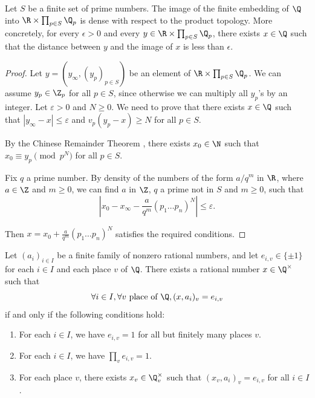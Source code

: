 \begin{theorem}\label{thm:approximation}%
	\leanok
	Let $S$ be a finite set of prime numbers.
	The image of the finite embedding of $\Q$ into $\R \times \prod_{p \in S} \Q_p$ is dense with respect to
	the product topology. More concretely, for every $\epsilon > 0$ and every
	$y \in \R \times \prod_{p \in S} \Q_p$, there exists $x \in \Q$ such that the distance
	between $y$ and the image of $x$ is less than $\epsilon$.
\end{theorem}
\begin{proof}
	Let $y=(y_\infty, (y_p)_{p \in S})$ be an element of $\R \times \prod_{p \in S} \Q_p$.
	We can assume $y_p \in \Z_p$ for all $p \in S$, since otherwise we can multiply all $y_p$'s by an
	integer. Let $\varepsilon > 0$ and $N \ge 0$. We need to prove that there exists $x \in \Q$ such that
	$|y_\infty - x| \le \varepsilon$ and $v_p(y_p - x) \ge N$ for all $p \in S$.

	By the Chinese Remainder Theorem , there exists $x_0 \in \N$
	such that $x_0 \equiv y_p \pmod{p^N}$ for all $p \in S$.

	Fix $q$ a prime number. By density of the numbers of the form $a/q^m$ in $\R$, where $a \in \Z$
	and $m \ge 0$, we can find $a$ in $\Z$, $q$ a prime not in $S$ and $m \ge 0$, such that
	\[
	|x_0 - x_\infty - \frac{a}{q^m}(p_1\dots p_n)^N| \le \varepsilon.
	\]

	Then $x = x_0 + \frac{a}{q^m}(p_1\dots p_n)^N$ satisfies the required conditions.
\end{proof}


\begin{theorem}\label{thm:existence}
	\leanok
	Let $(a_i)_{i \in I}$ be a finite family of nonzero rational numbers, and let
	$e_{i,v} \in \{\pm 1\}$ for each $i \in I$ and each place $v$ of $\Q$. There exists a rational
	number $x \in \Q^\times$ such that
	\[
	\forall i \in I, \forall v \text{ place of } \Q, (x,a_i)_v=e_{i,v}
	\]
	if and only if the following conditions hold:
	\begin{enumerate}
		\item For each $i \in I$, we have $e_{i,v}=1$ for all but finitely many places $v$.
		\item For each $i \in I$, we have $\prod_v e_{i,v}=1$.
		\item For each place $v$, there exists $x_v \in \Q_v^\times$ such that
		$(x_v, a_i)_v = e_{i,v}$ for all $i \in I$.
	\end{enumerate}
\end{theorem}

